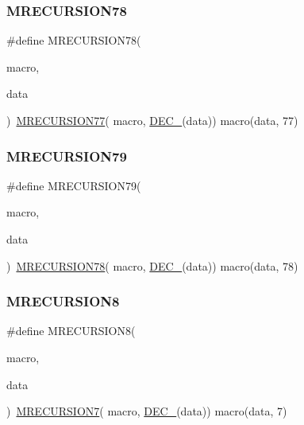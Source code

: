 \subsubsection{\texorpdfstring{MRECURSION78}{MRECURSION78}}
{\footnotesize\ttfamily \#define M\+R\+E\+C\+U\+R\+S\+I\+O\+N78(\begin{DoxyParamCaption}\item[{}]{macro,  }\item[{}]{data }\end{DoxyParamCaption})~\mbox{\hyperlink{group__group__sam0__utils__mrecursion_gab51a9540134b976571d7ed113a047711}{M\+R\+E\+C\+U\+R\+S\+I\+O\+N77}}(  macro, \mbox{\hyperlink{group__group__sam0__utils__mrecursion_ga1d23d683797679dca8c3512a54a5dcae}{D\+E\+C\+\_\+}}(data))   macro(data, 77)}

\mbox{\label{group__group__sam0__utils__mrecursion_ga5e756a7c7f7758383e87c19208a6090c}} 
\subsubsection{\texorpdfstring{MRECURSION79}{MRECURSION79}}
{\footnotesize\ttfamily \#define M\+R\+E\+C\+U\+R\+S\+I\+O\+N79(\begin{DoxyParamCaption}\item[{}]{macro,  }\item[{}]{data }\end{DoxyParamCaption})~\mbox{\hyperlink{group__group__sam0__utils__mrecursion_ga44f0f6b328ba8fb25e23a395afb8da8a}{M\+R\+E\+C\+U\+R\+S\+I\+O\+N78}}(  macro, \mbox{\hyperlink{group__group__sam0__utils__mrecursion_ga1d23d683797679dca8c3512a54a5dcae}{D\+E\+C\+\_\+}}(data))   macro(data, 78)}

\mbox{\label{group__group__sam0__utils__mrecursion_gacca8590be6aada8914a304fd29258c46}} 
\subsubsection{\texorpdfstring{MRECURSION8}{MRECURSION8}}
{\footnotesize\ttfamily \#define M\+R\+E\+C\+U\+R\+S\+I\+O\+N8(\begin{DoxyParamCaption}\item[{}]{macro,  }\item[{}]{data }\end{DoxyParamCaption})~\mbox{\hyperlink{group__group__sam0__utils__mrecursion_ga995e80fc9e504c74b860f862ab3cc474}{M\+R\+E\+C\+U\+R\+S\+I\+O\+N7}}(  macro, \mbox{\hyperlink{group__group__sam0__utils__mrecursion_ga1d23d683797679dca8c3512a54a5dcae}{D\+E\+C\+\_\+}}(data))   macro(data, 7)}

